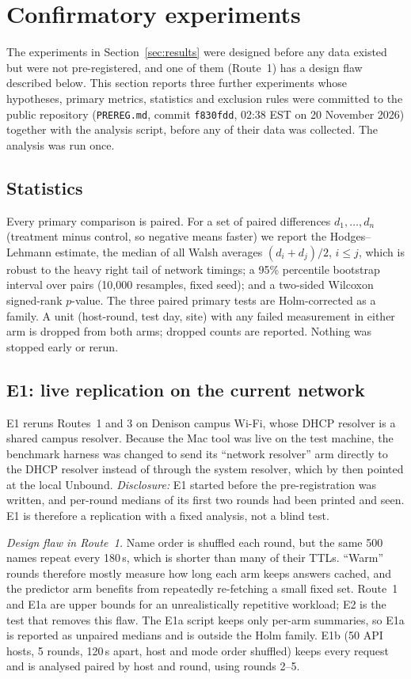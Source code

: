 \section{Confirmatory experiments}
\label{sec:confirm}
The experiments in Section~\ref{sec:results} were designed before any data existed but were not pre-registered, and one of them (Route~1) has a design flaw described below. This section reports three further experiments whose hypotheses, primary metrics, statistics and exclusion rules were committed to the public repository (\texttt{PREREG.md}, commit \texttt{f830fdd}, 02:38 EST on 20 November 2026) together with the analysis script, before any of their data was collected. The analysis was run once.

\subsection{Statistics}
Every primary comparison is paired. For a set of paired differences $d_1,\dots,d_n$ (treatment minus control, so negative means faster) we report the Hodges--Lehmann estimate, the median of all Walsh averages $(d_i+d_j)/2$, $i\le j$, which is robust to the heavy right tail of network timings; a 95\% percentile bootstrap interval over pairs (10{,}000 resamples, fixed seed); and a two-sided Wilcoxon signed-rank $p$-value. The three paired primary tests are Holm-corrected as a family. A unit (host-round, test day, site) with any failed measurement in either arm is dropped from both arms; dropped counts are reported. Nothing was stopped early or rerun.

\subsection{E1: live replication on the current network}
E1 reruns Routes~1 and 3 on Denison campus Wi-Fi, whose DHCP resolver is a shared campus resolver. Because the Mac tool was live on the test machine, the benchmark harness was changed to send its ``network resolver'' arm directly to the DHCP resolver instead of through the system resolver, which by then pointed at the local Unbound. \emph{Disclosure:} E1 started before the pre-registration was written, and per-round medians of its first two rounds had been printed and seen. E1 is therefore a replication with a fixed analysis, not a blind test.

\emph{Design flaw in Route~1.} Name order is shuffled each round, but the same 500 names repeat every 180\,s, which is shorter than many of their TTLs. ``Warm'' rounds therefore mostly measure how long each arm keeps answers cached, and the predictor arm benefits from repeatedly re-fetching a small fixed set. Route~1 and E1a are upper bounds for an unrealistically repetitive workload; E2 is the test that removes this flaw. The E1a script keeps only per-arm summaries, so E1a is reported as unpaired medians and is outside the Holm family. E1b (50 API hosts, 5 rounds, 120\,s apart, host and mode order shuffled) keeps every request and is analysed paired by host and round, using rounds 2--5.

